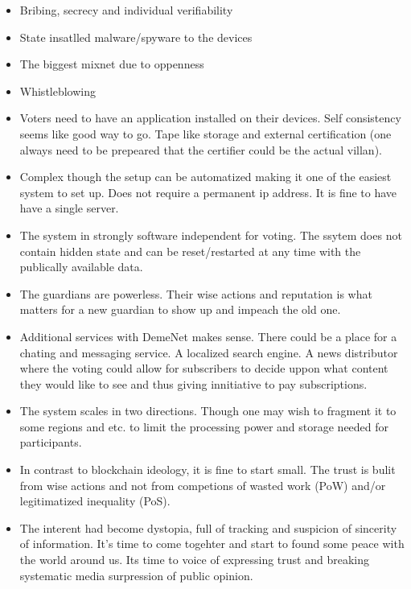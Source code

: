 \documentclass{article}
\begin{document}
\begin{itemize}
\item Bribing, secrecy and individual verifiability
\item State insatlled malware/spyware to the devices
\item The biggest mixnet due to oppenness
\item Whistleblowing
\item Voters need to have an application installed on their devices. Self consistency seems like good way to go. Tape like storage and external certification (one always need to be prepeared that the certifier could be the actual villan). 
\item Complex though the setup can be automatized making it one of the easiest system to set up. Does not require a permanent ip address. It is fine to have have a single server.
\item The system in strongly software independent for voting. The ssytem does not contain hidden state and can be reset/restarted at any time with the publically available data.
\item The guardians are powerless. Their wise actions and reputation is what matters for a new guardian to show up and impeach the old one.
\item Additional services with DemeNet makes sense. There could be a place for a chating and messaging service. A localized search engine. A news distributor where the voting could allow for subscribers to decide uppon what content they would like to see and thus giving innitiative to pay subscriptions. 
\item The system scales in two directions. Though one may wish to fragment it to some regions and etc. to limit the processing power and storage needed for participants.
\item In contrast to blockchain ideology, it is fine to start small. The trust is bulit from wise actions and not from competions of wasted work (PoW) and/or legitimatized inequality (PoS).
\item The interent had become dystopia, full of tracking and suspicion of sincerity of information. It's time to come togehter and start to found some peace with the world around us. Its time to voice of expressing trust and breaking systematic media surpression of public opinion.
\end{itemize}
\end{document}
